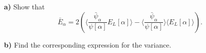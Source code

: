 \documentclass{beamer}
\newenvironment{doconceexercise}{}{}
\newcounter{doconceexercisecounter}
\newcounter{doconce:movie:counter}
\newcommand{\subex}[1]{\noindent\textbf{#1}}  %
\begin{document}
\begin{frame}

\begin{doconceexercise}

                             

\subex{a)}
Show that 
\[
\bar{E}_{\alpha} = 2\left( \langle \frac{\bar{\psi}_{\alpha}}{\psi[\alpha]}E_L[\alpha]\rangle -\langle \frac{\bar{\psi}_{\alpha}}{\psi[\alpha]}\rangle\langle E_L[\alpha] \rangle\right).
\]


\subex{b)}
Find the corresponding expression for the variance.


\end{doconceexercise}
\end{frame}
\end{document}
